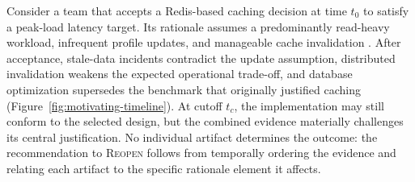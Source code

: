 \documentclass[10pt,conference]{IEEEtran}
\begin{document}
Consider a team that accepts a Redis-based caching decision at time $t_0$ to satisfy a peak-load latency target. Its rationale assumes a predominantly read-heavy workload, infrequent profile updates, and manageable cache invalidation \cite{Bucaioni2024Continuous,Su2026Violations}. After acceptance, stale-data incidents contradict the update assumption, distributed invalidation weakens the expected operational trade-off, and database optimization supersedes the benchmark that originally justified caching (Figure~\ref{fig:motivating-timeline}). At cutoff $t_c$, the implementation may still conform to the selected design, but the combined evidence materially challenges its central justification. No individual artifact determines the outcome: the recommendation to \textsc{Reopen} follows from temporally ordering the evidence and relating each artifact to the specific rationale element it affects.
\end{document}
